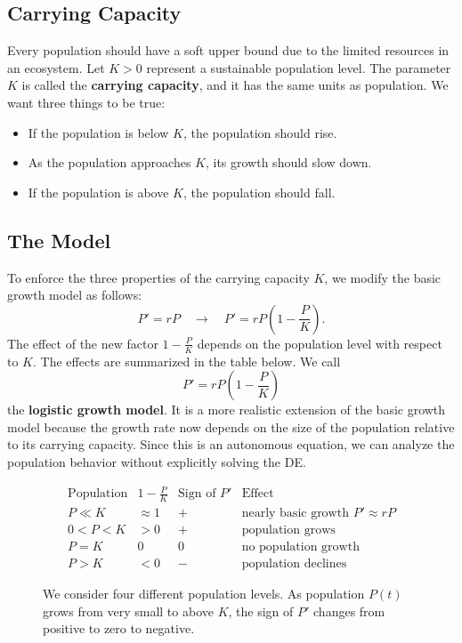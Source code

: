 \documentclass[10pt,letterpaper]{article}
\begin{document}
\subsection{Carrying Capacity}

Every population should have a soft upper bound due to the limited resources
in an ecosystem. Let $K>0$ represent a sustainable population level. The
parameter $K$ is called the \textbf{carrying capacity}, and it has the same
units as population. We want three things to be true:
\begin{itemize}
    \item If the population is below $K$, the population should rise.
    \item As the population approaches $K$, its growth should slow down.
    \item If the population is above $K$, the population should fall.
\end{itemize}

\subsection{The Model}
To enforce the three properties of the carrying capacity $K$, we modify the basic growth model as follows:
$$
P' =rP \quad \rightarrow \quad P' = rP\left(1-\frac{P}{K}\right).
$$
The effect of the new factor  $1-\tfrac{P}{K}$ depends on the population level with respect to $K.$ The effects are summarized in the table below. 
We call
\[
P'=rP\left(1-\frac{P}{K}\right)
\]
the \textbf{logistic growth model}. It is a more realistic extension of the
basic growth model because the growth rate now depends on the size of the
population relative to its carrying capacity. Since this is an autonomous equation, we can analyze the population behavior
without explicitly solving the DE.
\begin{figure}
    \centering
\[
\begin{array}{c|c|c|c}
\text{Population} & 1-\frac{P}{K} & \text{Sign of }P' & \text{Effect}\\
\hline
P\ll K & \approx 1 & + & \text{nearly basic growth }P'\approx rP \\[4pt]
0<P<K  & >0 &+& \text{population grows}\\[4pt]
P=K & 0 & 0 & \text{no population growth}\\[4pt]
P>K & <0 & - & \text{population declines}
\end{array}
\]
\caption{We consider four different population levels. As population $P(t)$ grows from very small to above $K$, the sign of $P'$ changes from positive to zero to negative.}
\end{figure}
\end{document}
